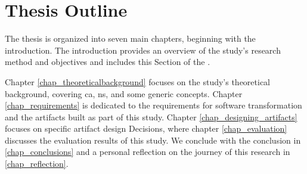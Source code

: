 \section{Thesis Outline} \label{sec_structure}

The thesis is organized into seven main chapters, beginning with the introduction. The
introduction provides an overview of the study's research method and objectives and
includes this Section of the .

Chapter \ref{chap_theoreticalbackground} focuses on the study's theoretical background,
covering \gls{ca}, \gls{ns}, and some generic concepts. Chapter \ref{chap_requirements} is
dedicated to the requirements for software transformation and the artifacts built as part
of this study. Chapter \ref{chap_designing_artifacts} focuses on specific artifact design
Decisions, where chapter \ref{chap_evaluation} discusses the evaluation results of this
study. We conclude with the conclusion in \ref{chap_conclusions} and a personal reflection
on the journey of this research in \ref{chap_reflection}.